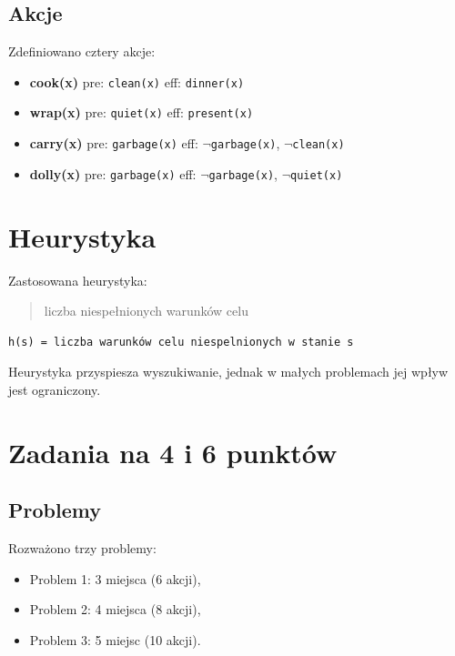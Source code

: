 \documentclass[a4paper,12pt]{article}
\begin{document}
\subsection{Akcje}

Zdefiniowano cztery akcje:

\begin{itemize}
    \item \textbf{cook(x)}  
    pre: \texttt{clean(x)}  
    eff: \texttt{dinner(x)}

    \item \textbf{wrap(x)}  
    pre: \texttt{quiet(x)}  
    eff: \texttt{present(x)}

    \item \textbf{carry(x)}  
    pre: \texttt{garbage(x)}  
    eff: $\neg$\texttt{garbage(x)}, $\neg$\texttt{clean(x)}

    \item \textbf{dolly(x)}  
    pre: \texttt{garbage(x)}  
    eff: $\neg$\texttt{garbage(x)}, $\neg$\texttt{quiet(x)}
\end{itemize}

\section{Heurystyka}

Zastosowana heurystyka:

\begin{quote}
liczba niespełnionych warunków celu
\end{quote}

\begin{verbatim}
h(s) = liczba warunków celu niespelnionych w stanie s
\end{verbatim}

Heurystyka przyspiesza wyszukiwanie, jednak w małych problemach jej wpływ jest ograniczony.

\section{Zadania na 4 i 6 punktów}

\subsection{Problemy}

Rozważono trzy problemy:
\begin{itemize}
    \item Problem 1: 3 miejsca (6 akcji),
    \item Problem 2: 4 miejsca (8 akcji),
    \item Problem 3: 5 miejsc (10 akcji).
\end{itemize}
\end{document}
